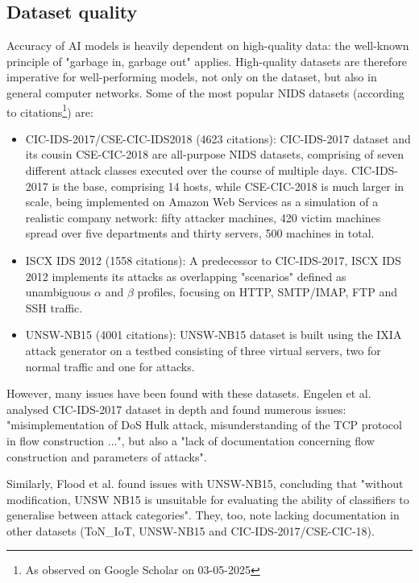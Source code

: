 \subsection{Dataset quality}
Accuracy of AI models is heavily dependent on high-quality data: the well-known principle of "garbage in, garbage out" applies. High-quality datasets are therefore imperative for well-performing models, not only on the dataset, but also in general computer networks. Some of the most popular NIDS datasets (according to citations\footnote{As observed on Google Scholar on 03-05-2025}) are:
\begin{itemize}
    \item CIC-IDS-2017/CSE-CIC-IDS2018 \cite{cic_2017, cic_2018} (4623 citations): CIC-IDS-2017 dataset and its cousin CSE-CIC-2018 are all-purpose NIDS datasets, comprising of seven different attack classes executed over the course of multiple days. CIC-IDS-2017 is the base, comprising 14 hosts, while CSE-CIC-2018 is much larger in scale, being implemented on Amazon Web Services as a simulation of a realistic company network: fifty attacker machines, 420 victim machines spread over five departments and thirty servers, 500 machines in total. 
    \item ISCX IDS 2012 \cite{iscx_ids_2012} (1558 citations): A predecessor to CIC-IDS-2017, ISCX IDS 2012 implements its attacks as overlapping "scenarios" defined as unambiguous $\alpha$ and $\beta$ profiles, focusing on HTTP, SMTP/IMAP, FTP and SSH traffic. 
    \item UNSW-NB15 \cite{unsw-nb15} (4001 citations): UNSW-NB15 dataset is built using the IXIA attack generator on a testbed consisting of three virtual servers, two for normal traffic and one for attacks.
\end{itemize}

However, many issues have been found with these datasets. Engelen et al. \cite{troubleshooting_cic2017} analysed CIC-IDS-2017 dataset in depth and found numerous issues: "misimplementation of DoS Hulk attack, misunderstanding of the TCP protocol in flow construction ...", but also a "lack of documentation concerning flow construction and parameters of attacks".  

Similarly, Flood et al. \cite{bad_design_smells} found issues with UNSW-NB15, concluding that "without modification, UNSW NB15 is unsuitable for evaluating the ability of classifiers to generalise between attack categories". They, too, note lacking documentation in other datasets (ToN\_IoT, UNSW-NB15 and CIC-IDS-2017/CSE-CIC-18).

